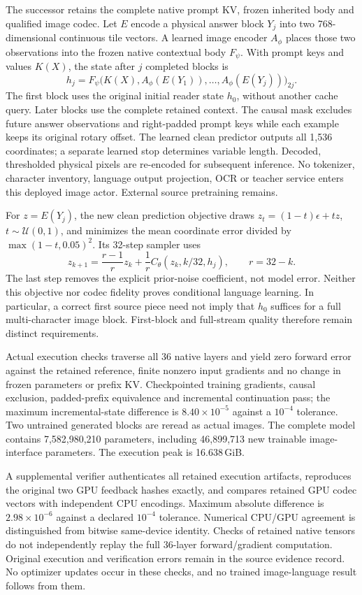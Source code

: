\documentclass[10pt,a4paper]{article}
\begin{document}
The successor retains the complete native prompt KV, frozen inherited body and
qualified image codec. Let $E$ encode a physical answer block $Y_j$ into two
768-dimensional continuous tile vectors. A learned image encoder $A_\phi$
places those two observations into the frozen native contextual body $F_\psi$.
With prompt keys and values $K(X)$, the state after $j$ completed blocks is
\[
 h_j=F_\psi\bigl(K(X),A_\phi(E(Y_1)),\ldots,A_\phi(E(Y_j))\bigr)_{2j}.
\]
The first block uses the original initial reader state $h_0$, without another
cache query. Later blocks use the complete retained context. The causal mask
excludes future answer observations and right-padded prompt keys while each
example keeps its original rotary offset. The learned clean predictor outputs
all 1,536 coordinates; a separate learned stop determines variable length.
Decoded, thresholded physical pixels are re-encoded for subsequent inference.
No tokenizer, character inventory, language output projection, OCR or teacher
service enters this deployed image actor. External source pretraining remains.

For $z=E(Y_j)$, the new clean prediction objective draws
$z_t=(1-t)\epsilon+tz$, $t\sim\mathcal U(0,1)$, and minimizes the mean coordinate
error divided by $\max(1-t,0.05)^2$. Its 32-step sampler uses
\[
 z_{k+1}=\frac{r-1}{r}z_k+\frac{1}{r} C_\theta(z_k,k/32,h_j),\qquad r=32-k.
\]
The last step removes the explicit prior-noise coefficient, not model error.
Neither this objective nor codec fidelity proves conditional language learning.
In particular, a correct first source piece need not imply that $h_0$ suffices
for a full multi-character image block. First-block and full-stream quality
therefore remain distinct requirements.

Actual execution checks traverse all 36 native layers and yield zero forward
error against the retained reference, finite nonzero input gradients and no
change in frozen parameters or prefix KV. Checkpointed training gradients,
causal exclusion, padded-prefix equivalence and incremental continuation pass;
the maximum incremental-state difference is $8.40\times10^{-5}$ against a
$10^{-4}$ tolerance. Two untrained generated blocks are reread as actual images.
The complete model contains 7,582,980,210 parameters, including 46,899,713 new
trainable image-interface parameters. The execution peak is 16.638\,GiB.

A supplemental verifier authenticates all retained execution artifacts,
reproduces the original two GPU feedback hashes exactly, and compares retained
GPU codec vectors with independent CPU encodings. Maximum absolute difference
is $2.98\times10^{-6}$ against a declared $10^{-4}$ tolerance. Numerical CPU/GPU
agreement is distinguished from bitwise same-device identity. Checks of retained
native tensors do not independently replay the full 36-layer forward/gradient
computation. Original execution and verification errors remain in the source
evidence record. No optimizer updates occur in these checks, and no trained
image-language result follows from them.
\end{document}
